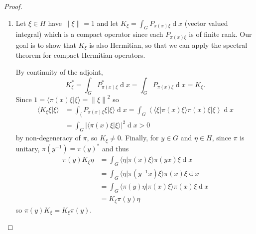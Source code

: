 \documentclass[11pt, a4paper]{memoir}
\newcommand{\norm}[1]{\ensuremath{\left\lVert#1\right\rVert}}
\theoremstyle{change}
\theoremstyle{plain}
\theoremstyle{nonumberplain}
\newtheorem{proof}{Proof}
\renewcommand{\d}[1]{\ensuremath{\operatorname{d}\!{#1}}}
\numberwithin{equation}{section}
\begin{document}
\begin{proof}
    \begin{enumerate}[r]
        \item Let $\xi\in H$ have $\norm{\xi}=1$ and let $K_\xi=\int_G P_{\pi(x)\xi}\d{x}$ (vector valued integral) which is a compact operator since each $P_{\pi(x)\xi}$ is of finite rank.
            Our goal is to show that $K_\xi$ is also Hermitian, so that we can apply the spectral theorem for compact Hermitian operators.

            By continuity of the adjoint,
            \begin{equation*}
                K_\xi^*=\int_G P_{\pi(x)\xi}^*\d{x}=\int_GP_{\pi(x)\xi}\d{x}=K_\xi.
            \end{equation*}
            Since $1=\langle\pi(x)\xi|\xi\rangle=\norm{\xi}^2$ so
            \begin{align*}
                \langle K_\xi\xi|\xi\rangle &= \int_\langle P_{\pi(x)\xi}\xi|\xi\rangle\d{x} = \int_G\left\langle\langle\xi|\pi(x)\xi\rangle\pi(x)\xi|\xi\right\rangle\d{x}\\
                                            &= \int_G |\langle\pi(x)\xi|\xi\rangle|^2\d{x}>0
            \end{align*}
            by non-degeneracy of $\pi$, so $K_\xi\neq 0$.
            Finally, for $y\in G$ and $\eta\in H$, since $\pi$ is unitary, $\pi(y^{-1})=\pi(y)^*$ and thus
            \begin{align*}
                \pi(y)K_\xi\eta &= \int_G\langle\eta|\pi(x)\xi\rangle\pi(yx)\xi\d{x}\\
                                &= \int_G\langle\eta|\pi(y^{-1}x)\xi\rangle\pi(x)\xi\d{x}\\
                                &= \int_G\langle\pi(y)\eta|\pi(x)\xi\rangle\pi(x)\xi\d{x}\\
                                &= K_\xi\pi(y)\eta
            \end{align*}
            so $\pi(y)K_\xi=K_\xi\pi(y)$.


\end{enumerate}
\end{proof}
\end{document}
